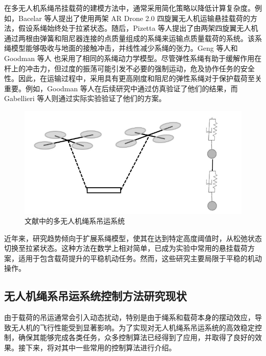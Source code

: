 \documentclass[lang=chs, degree=master, blindreview=true, winfonts=true]{yanputhesis}
\begin{document}

在多无人机系绳吊挂载荷的建模方法中，通常采用简化策略以降低计算复杂度。例如，Bacelar 等人\cite{bacelar2020board}提出了使用两架 AR Drone 2.0 四旋翼无人机运输悬挂载荷的方法，假设系绳始终处于拉紧状态。随后，Pizetta 等人提出了由两架四旋翼无人机通过两根由弹簧和阻尼器连接的点质量组成的系绳来运输点质量载荷的系统。该系绳模型能够吸收与地面的接触冲击，并线性减少系绳的张力。Geng 等人\cite{geng2020cooperative}和 Goodman 等人\cite{goodman2023geometric} 也采用了相同的系绳动力学模型。尽管弹性系绳有助于缓解作用在杆上的冲击力，但过度的振荡可能引发不必要的强制运动，危及协作任务的安全性。因此，在运输过程中，采用具有更高刚度和阻尼的弹性系绳对于保护载荷至关重要。例如，Goodman 等人\cite{goodman2022geometric}在后续研究中通过仿真验证了他们的结果，而 Gabellieri 等人\cite{gabellieri2023equilibria}则通过实际实验验证了他们的方案。

\begin{figure}[hbt!]
	\centering
	\includegraphics[width=28pc]{picture/1_8.png} 
	\caption{文献中的多无人机绳系吊运系统} \label{1_8}
\end{figure}
近年来，研究趋势倾向于扩展系绳模型，使其在达到特定高度阈值时，从松弛状态切换至拉紧状态\cite{rao2023integrated,arab2022cooperative,doakhan2023robust,mohammadi2021passivity}。这种方法在数学上相对简单，已成为实验中常用的悬挂载荷方案，适用于包含载荷提升的平稳机动任务。然而，这些研究主要局限于平稳的机动操作。

\subsection{无人机绳系吊运系统控制方法研究现状}
由于载荷的吊运通常会引入动态扰动，特别是由于绳系和载荷本身的摆动效应，导致无人机的飞行性能受到显著影响。为了实现对无人机绳系吊运系统的高效稳定控制，确保其能够完成各类任务，众多控制算法已经得到了应用，并取得了良好的效果。接下来，将对其中一些常用的控制算法进行介绍。
\end{document}
